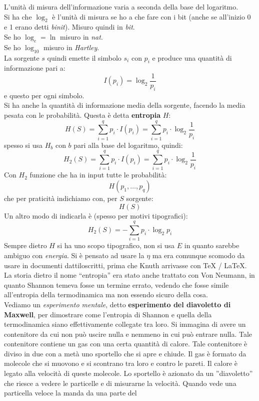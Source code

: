 \documentclass[a4paper,12pt, oneside]{book}
\begin{document}
L'unità di misura dell'informazione varia a seconda della base del logaritmo.\\
Si ha che $\log_2$ è l'unità di misura se ho a che fare con i bit (anche se
all'inizio 0 e 1 erano detti \textit{binit}). Misuro quindi in \textit{bit}. \\
Se ho $\log_e=\ln$ misuro in \textit{nat}.\\
Se ho $\log_{10}$ misuro in \textit{Hartley}.\\
La sorgente $s$ quindi emette il simbolo $s_i$ con $p_i$ e produce una quantità
di informazione pari a:
\[I(p_i)=\log_2\frac{1}{p_i}\]
e questo per ogni simbolo.\\
Si ha anche la quantità di informazione media della sorgente, facendo la media
pesata con le probabilità. Questa è detta \textbf{entropia} $H$:
\[H(S)=\sum_{i=1}^qp_i\cdot I(p_i)=\sum_{i=1}^qp_i\cdot \log_2\frac{1}{p_i}\]
spesso si usa $H_b$ con $b$ pari alla base del logaritmo, quindi:
\[H_2(S)=\sum_{i=1}^qp_i\cdot I(p_i)=\sum_{i=1}^qp_i\cdot \log_2\frac{1}{p_i}\]
Con $H_2$ funzione che ha in input tutte le probabilità:
\[H(p_1,\ldots,p_q)\]
che per praticità indichiamo con, per $S$ sorgente:
\[H(S)\]
Un altro modo di indicarla è (spesso per motivi tipografici):
\[H_2(S)=-\sum_{i=1}^qp_i\cdot \log_2{p_i}\]
Sempre dietro $H$ si ha uno scopo tipografico, non si usa $E$ in quanto sarebbe
ambiguo con \textit{energia}. Si è pensato ad usare la $\eta$ ma era comunque
scomodo da usare in documenti dattiloscritti, prima che Knuth arrivasse con \TeX
/ \LaTeX.\\
La storia dietro il nome ``entropia'' era stato anche trattato con Von Neumann,
in quanto Shannon temeva fosse un termine errato, vedendo che fosse simile
all'entropia della termodinamica ma non essendo sicuro della cosa.\\
Vediamo un \textit{esperimento mentale}, detto \textbf{esperimento del
  diavoletto di Maxwell}, per dimostrare come l'entropia di Shannon e quella
della termodinamica siano effettivamente collegate tra loro. Si immagina di
avere un contenitore da cui non può uscire nulla e nemmeno in cui può entrare
nulla. Tale contenitore contiene un gas con una certa quantità di calore. Tale
contenitore è diviso in due con a metà uno sportello che si apre e chiude. Il
gas è formato da molecole che si muovono e si scontrano tra loro e contro le
pareti. Il calore è legato alla velocità di queste molecole. Lo sportello è
azionato da un ''diavoletto'' che riesce a vedere le particelle e di misurarne
la velocità. Quando vede una particella veloce la manda da una parte del
\end{document}
